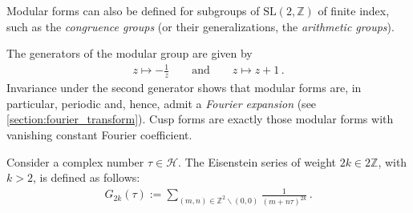     \begin{remark}
        Modular forms can also be defined for subgroups of $\mathrm{SL}(2,\mathbb{Z})$ of finite index, such as the \textit{congruence groups} (or their generalizations, the \textit{arithmetic groups}).
    \end{remark}

    \begin{property}
        The generators of the modular group are given by
        \begin{gather}
            z\mapsto-\frac{1}{z}\qquad\text{and}\qquad z\mapsto z+1\,.
        \end{gather}
        Invariance under the second generator shows that modular forms are, in particular, periodic and, hence, admit a \textit{Fourier expansion} (see \cref{section:fourier_transform}). Cusp forms are exactly those modular forms with vanishing constant Fourier coefficient.
    \end{property}

    \begin{example}
        Consider a complex number $\tau\in\mathcal{H}$. The Eisenstein series of weight $2k\in2\mathbb{Z}$, with $k>2$, is defined as follows:
        \begin{gather}
            G_{2k}(\tau) := \sum_{(m,n)\in\mathbb{Z}^2\backslash(0,0)}\frac{1}{(m+n\tau)^{2k}}\,.
        \end{gather}
    \end{example}

